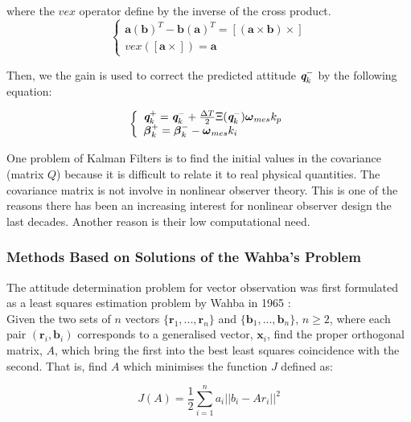 \documentclass[conference]{IEEEtran}
\begin{document}
where the $vex$ operator define by the inverse of the cross product.
\begin{equation}
\left\{\begin{array}{l}
\textbf{a}(\textbf{b})^T -  \textbf{b}(\textbf{a})^T  = [ (\textbf{a} \times \textbf{b}) \times ]\\
vex([\textbf{a}\times])  = \textbf{a}
 \end{array}
\right.
\end{equation}

Then, we the gain is used to correct the predicted attitude $\textbf{\em q}_{k}^-$ by the following equation:

\begin{equation}
\left\{\begin{array}{l}
\textbf{\em q}_{k}^+ = \textbf{\em q}_{k}^- + \frac{\Delta T}{2} \Xi(\textbf{\em q}_{k}^-) \boldsymbol\omega_{mes}k_p\\
\boldsymbol \beta_k^+ = \boldsymbol \beta_{k}^-  - \boldsymbol\omega_{mes}k_i
 \end{array}
\right.
\end{equation}

One problem of Kalman Filters is to find the initial values in the covariance (matrix $Q$) because it is difficult to relate it to real physical quantities. The covariance matrix is not involve in nonlinear observer theory. This is one of the reasons there has been an increasing interest for nonlinear observer design the last decades. Another reason is their low computational need.

\subsubsection{Methods Based on Solutions of the Wahba's Problem}

The attitude determination problem for vector observation was first formulated as a least squares estimation problem by Wahba \cite{wahba_least_1965} in 1965 :\\


Given the two sets of $n$ vectors $\{ \textbf{r}_{1},...,\textbf{r}_{n} \}$ and $\{ \textbf{b}_{1},...,\textbf{b}_{n} \}$, $n \geqslant 2 $, where each pair $(\textbf{r}_{i},\textbf{b}_{i})$ corresponds to a generalised vector, $\textbf{x}_{i}$, find the proper orthogonal matrix, $A$, which bring the first into the best least squares coincidence with the second. That is, find $A$ which minimises the function $J$ defined as:

\begin{equation}
J(A) = \frac{1}{2} \sum_{i=1}^n a_i||b_i-Ar_i||^2
\label{Wahba_loss_function}
\end{equation}
\end{document}
